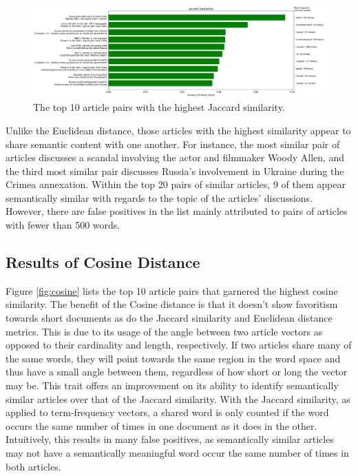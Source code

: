 \documentclass[11pt]{article}
\begin{document}
\begin{figure}[h] \label{fig:jaccard}
  \centering
  \includegraphics[width=\textwidth]{figures/jaccard_most_sim}
  \caption{The top 10 article pairs with the highest Jaccard similarity.}
\end{figure}

Unlike the Euclidean distance, those articles with the highest similarity appear to share semantic content with one another.
For instance, the most similar pair of articles discusses a scandal involving the actor and filmmaker Woody Allen, and the third most similar pair discusses Russia's involvement in Ukraine during the Crimea annexation.
Within the top 20 pairs of similar articles, 9 of them appear semantically similar with regards to the topic of the articles' discussions.
However, there are false positives in the list mainly attributed to pairs of articles with fewer than 500 words.

\subsection{Results of Cosine Distance}

Figure \ref{fig:cosine} lists the top 10 article pairs that garnered the highest cosine similarity.
The benefit of the Cosine distance is that it doesn't show favoritism towards short documents as do the Jaccard similarity and Euclidean distance metrics.
This is due to its usage of the angle between two article vectors as opposed to their cardinality and length, respectively.
If two articles share many of the same words, they will point towards the same region in the word space and thus have a small angle between them, regardless of how short or long the vector may be.
This trait offers an improvement on its ability to identify semantically similar articles over that of the Jaccard similarity.
With the Jaccard similarity, as applied to term-frequency vectors, a shared word is only counted if the word occurs the same number of times in one document as it does in the other.
Intuitively, this results in many false positives, as semantically similar articles may not have a semantically meaningful word occur the same number of times in both articles.
\end{document}

